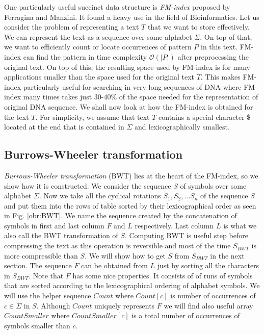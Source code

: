 One particularly useful succinct data structure is \textit{FM-index} proposed by Ferragina
and Manzini\cite{ferragina2000opportunistic}. It found a heavy use in the field of
Bioinformatics. Let us consider the problem of representing a text $T$ that we want to
store effectively. We can represent the text as a sequence over some alphabet $\Sigma$.
On top of that, we want to efficiently count or locate occurrences of pattern $P$
in this text. FM-index can find the pattern in time complexity $\mathcal{O}(|P|)$
after preprocessing the original text. On top of this, the resulting
space used by FM-index is for many applications smaller than the space used for the
original text $T$. This makes FM-index particularly useful for searching in very long sequences
of DNA where FM-index many times takes just 30-40\% of the space needed for the representation
of original DNA sequence. We shall now look at how the FM-index is obtained for the text $T$.
For simplicity, we assume that text $T$ contains a special character \$ located at the end
that is contained in $\Sigma$ and lexicographically smallest.

\subsection{Burrows-Wheeler transformation}

\textit{Burrows-Wheeler transformation} (BWT) lies at the heart of the FM-index, so we show
how it is constructed. We consider the sequence $S$ of symbols over
some alphabet $\Sigma$. Now we take all the cyclical rotations $S_1, S_2, \ldots S_n$ of the
sequence $S$ and put them into the rows of table sorted by their lexicographical order as
seen in Fig. \ref{obr:BWT}. We name the sequence created by the concatenation of symbols
in first and last column $F$ and $L$ respectively. Last column $L$ is what we also call
the BWT transformation of $S$. Computing BWT is useful step before compressing
the text as this operation is reversible and most of the time $S_{BWT}$ is more compressible
than $S$. We will show how to get $S$ from $S_{BWT}$ in the next section. The sequence $F$ can
be obtained from $L$ just by sorting all the characters in $S_{BWT}$. Note that $F$ has some
nice properties. It consists of of runs of symbols that are sorted according to the lexicographical
ordering of alphabet symbols. We will use the helper sequence $Count$ where $Count[c]$ is
number of occurrences of $c\in\Sigma$ in $S$. Although $Count$ uniquely represents $F$ we will
find also useful array $CountSmaller$ where $CountSmaller[c]$ is a total number of occurrences
of symbols smaller than $c$.

